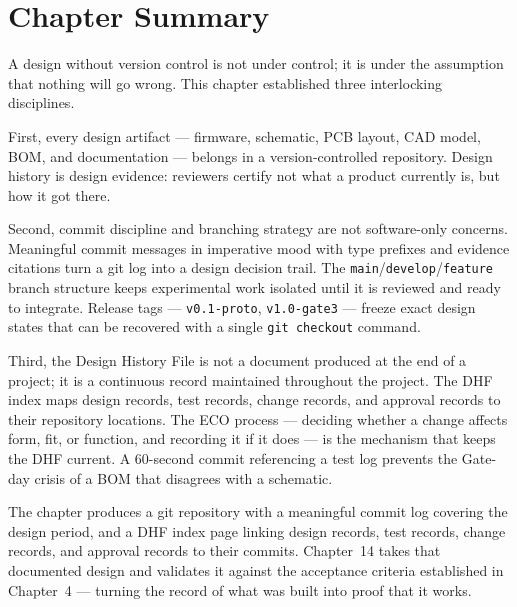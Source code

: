 \section*{Chapter Summary}
\label{sec:ch13-summary}

A design without version control is not under control; it is under the assumption that
nothing will go wrong.
This chapter established three interlocking disciplines.

First, every design artifact --- firmware, schematic, PCB layout, CAD model, BOM, and
documentation --- belongs in a version-controlled repository.
Design history is design evidence: reviewers certify not what a product currently is, but how it got there.

Second, commit discipline and branching strategy are not software-only concerns.
Meaningful commit messages in imperative mood with type prefixes and evidence citations
turn a git log into a design decision trail.
The \texttt{main}/\texttt{develop}/\texttt{feature} branch structure keeps experimental
work isolated until it is reviewed and ready to integrate.
Release tags --- \texttt{v0.1-proto}, \texttt{v1.0-gate3} --- freeze exact design states
that can be recovered with a single \texttt{git checkout} command.

Third, the Design History File is not a document produced at the end of a project; it is a
continuous record maintained throughout the project.
The DHF index maps design records, test records, change records, and approval records to
their repository locations.
The ECO process --- deciding whether a change affects form, fit, or function, and recording
it if it does --- is the mechanism that keeps the DHF current.
A 60-second commit referencing a test log prevents the Gate-day crisis of a BOM that
disagrees with a schematic.

The chapter produces a git repository with a meaningful commit log covering the design period, and a DHF index page linking design records, test records, change records, and approval records to their commits.
Chapter~14 takes that documented design and validates it against the acceptance criteria
established in Chapter~4 --- turning the record of what was built into proof that it works.
